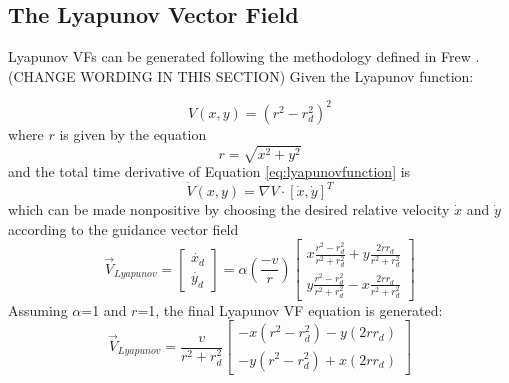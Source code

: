 \documentclass[conf]{new-aiaa}
\begin{document}
\subsection{The Lyapunov Vector Field}

Lyapunov VFs can be generated following the methodology defined in Frew {\cite{frew_coordinated_2008}}. (CHANGE WORDING IN THIS SECTION) Given the Lyapunov function:

\begin{equation}\label{eq:lyapunovfunction}
V(x,y) = (r^2 - r_d^2)^2
\end{equation}
where $r$ is given by the equation
\begin{equation}
r = \sqrt{x^2+y^2}
\end{equation}
and the total time derivative of Equation \ref{eq:lyapunovfunction} is
\begin{equation}
\dot{V}(x,y) = \nabla{V} \cdotp [\dot{x},\dot{y}]^{T}
\end{equation}
which can be made nonpositive by choosing the desired relative velocity $\dot{x}$ and $\dot{y}$ according to the guidance vector field
\begin{equation}
\overrightarrow{V}_{Lyapunov} = \begin{bmatrix} \dot{x_d} \\ \dot{y_d} \end{bmatrix} = \alpha \left(\frac{-v}{r}\right) \begin{bmatrix} x \frac{r^2-r_d^2}{r^2+r_d^2} + y \frac{2 r r_d}{r^2+r_d^2} \\ y \frac{r^2-r_d^2}{r^2+r_d^2} - x \frac{2 r r_d}{r^2+r_d^2} \end{bmatrix}
\end{equation}
Assuming $\alpha$=1 and $r$=1, the final Lyapunov VF equation is generated:
\begin{equation}\label{eq:lyapunovvf}
\overrightarrow{V}_{Lyapunov} = \frac{v}{r^2+r_d^2} \begin{bmatrix} - x (r^2-r_d^2) - y (2 r r_d) \\ - y (r^2-r_d^2) + x (2 r r_d) \end{bmatrix}
\end{equation}
\end{document}
